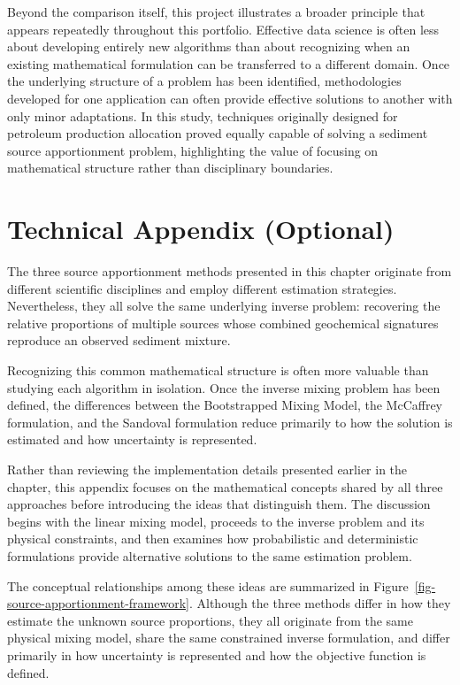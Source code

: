 \documentclass[
  12pt,
  letterpaper,
]{book}
\begin{document}
Beyond the comparison itself, this project illustrates a broader
principle that appears repeatedly throughout this portfolio. Effective
data science is often less about developing entirely new algorithms than
about recognizing when an existing mathematical formulation can be
transferred to a different domain. Once the underlying structure of a
problem has been identified, methodologies developed for one application
can often provide effective solutions to another with only minor
adaptations. In this study, techniques originally designed for petroleum
production allocation proved equally capable of solving a sediment
source apportionment problem, highlighting the value of focusing on
mathematical structure rather than disciplinary boundaries.

\section{Technical Appendix
(Optional)}\label{technical-appendix-optional-9}

The three source apportionment methods presented in this chapter
originate from different scientific disciplines and employ different
estimation strategies. Nevertheless, they all solve the same underlying
inverse problem: recovering the relative proportions of multiple sources
whose combined geochemical signatures reproduce an observed sediment
mixture.

Recognizing this common mathematical structure is often more valuable
than studying each algorithm in isolation. Once the inverse mixing
problem has been defined, the differences between the Bootstrapped
Mixing Model, the McCaffrey formulation, and the Sandoval formulation
reduce primarily to how the solution is estimated and how uncertainty is
represented.

Rather than reviewing the implementation details presented earlier in
the chapter, this appendix focuses on the mathematical concepts shared
by all three approaches before introducing the ideas that distinguish
them. The discussion begins with the linear mixing model, proceeds to
the inverse problem and its physical constraints, and then examines how
probabilistic and deterministic formulations provide alternative
solutions to the same estimation problem.

The conceptual relationships among these ideas are summarized in
Figure~\ref{fig-source-apportionment-framework}. Although the three
methods differ in how they estimate the unknown source proportions, they
all originate from the same physical mixing model, share the same
constrained inverse formulation, and differ primarily in how uncertainty
is represented and how the objective function is defined.
\end{document}
